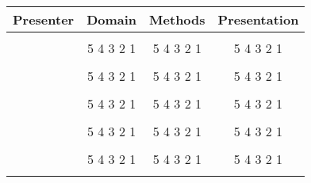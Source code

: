 \documentclass[12pt]{article}
\begin{document}
\begin{center}
\begin{tabular}{cccc}
\toprule
Presenter & Domain & Methods & Presentation\\
\midrule \\
 & \phantom{xxx}5 4 3 2 1 \phantom{xxx} & \phantom{xxx}5 4 3 2 1 \phantom{xxx} & \phantom{xxx} 5 4 3 2 1 \phantom{xxx} \\\\
 & \phantom{xxx}5 4 3 2 1 \phantom{xxx} & \phantom{xxx}5 4 3 2 1 \phantom{xxx} & \phantom{xxx} 5 4 3 2 1 \phantom{xxx} \\\\
 & \phantom{xxx}5 4 3 2 1 \phantom{xxx} & \phantom{xxx}5 4 3 2 1 \phantom{xxx} & \phantom{xxx} 5 4 3 2 1 \phantom{xxx} \\\\
 & \phantom{xxx}5 4 3 2 1 \phantom{xxx} & \phantom{xxx}5 4 3 2 1 \phantom{xxx} & \phantom{xxx} 5 4 3 2 1 \phantom{xxx} \\\\
 & \phantom{xxx}5 4 3 2 1 \phantom{xxx} & \phantom{xxx}5 4 3 2 1 \phantom{xxx} & \phantom{xxx} 5 4 3 2 1 \phantom{xxx} \\\\
\bottomrule
\end{tabular}
\end{center}
\end{document}
